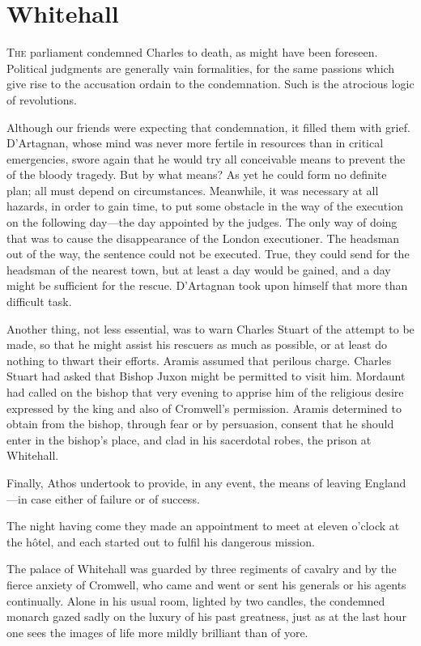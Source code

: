 \chapter{Whitehall}

 \lettrine{T}{he} parliament condemned Charles to death, as might have been foreseen. Political judgments are generally vain formalities, for the same passions which give rise to the accusation ordain to the condemnation. Such is the atrocious logic of revolutions.

\zz
Although our friends were expecting that condemnation, it filled them with grief. D'Artagnan, whose mind was never more fertile in resources than in critical emergencies, swore again that he would try all conceivable means to prevent the  of the bloody tragedy. But by what means? As yet he could form no definite plan; all must depend on circumstances. Meanwhile, it was necessary at all hazards, in order to gain time, to put some obstacle in the way of the execution on the following day—the day appointed by the judges. The only way of doing that was to cause the disappearance of the London executioner. The headsman out of the way, the sentence could not be executed. True, they could send for the headsman of the nearest town, but at least a day would be gained, and a day might be sufficient for the rescue. D'Artagnan took upon himself that more than difficult task.

Another thing, not less essential, was to warn Charles Stuart of the attempt to be made, so that he might assist his rescuers as much as possible, or at least do nothing to thwart their efforts. Aramis assumed that perilous charge. Charles Stuart had asked that Bishop Juxon might be permitted to visit him. Mordaunt had called on the bishop that very evening to apprise him of the religious desire expressed by the king and also of Cromwell's permission. Aramis determined to obtain from the bishop, through fear or by persuasion, consent that he should enter in the bishop's place, and clad in his sacerdotal robes, the prison at Whitehall.

Finally, Athos undertook to provide, in any event, the means of leaving England—in case either of failure or of success.

The night having come they made an appointment to meet at eleven o'clock at the hôtel, and each started out to fulfil his dangerous mission.

The palace of Whitehall was guarded by three regiments of cavalry and by the fierce anxiety of Cromwell, who came and went or sent his generals or his agents continually. Alone in his usual room, lighted by two candles, the condemned monarch gazed sadly on the luxury of his past greatness, just as at the last hour one sees the images of life more mildly brilliant than of yore.

